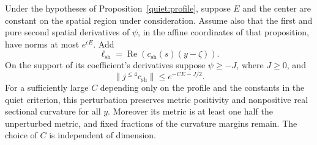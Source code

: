 \begin{proposition}\label{quiet:shear}
Under the hypotheses of Proposition~\ref{quiet:profile}, suppose \(E\) and
the center are constant on the spatial region under consideration.
Assume also that the first and pure second spatial derivatives of
\(\psi\), in the affine coordinates of that proposition, have norms
at most \(e^{\epsilon E}\).  Add
\[
 \ell_{\mathrm{sh}}=\operatorname{Re}(c_{\mathrm{sh}}(s)(y-\zeta)).
\]
On the support of its coefficient's derivatives suppose
\(\psi\ge-J\), where \(J\ge0\), and
\begin{equation}\label{quiet:shear-small}
 \|j^{\le4}c_{\mathrm{sh}}\|\le e^{-C E-J/2}.
\end{equation}
For a sufficiently large \(C\) depending only on the profile and the
constants in the quiet criterion, this perturbation preserves metric
positivity and nonpositive real sectional curvature for all \(y\).
Moreover its metric is at least one half the unperturbed metric, and
fixed fractions of the curvature margins remain.  The choice of \(C\) is
independent of dimension.
\end{proposition}

